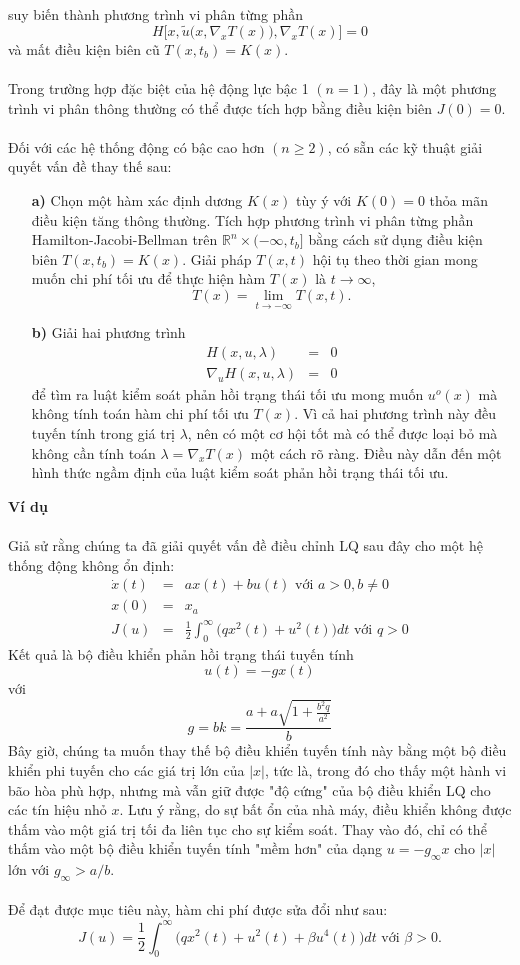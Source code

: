 \documentclass[12pt,a4paper]{report}
\begin{document}
suy biến thành phương trình vi phân từng phần $$H\big[x, \tilde{u}\big(x, \nabla_xT(x)\big), \nabla_xT(x)\big] = 0$$ và mất điều kiện biên cũ $T(x, t_b) = K(x)$.\\\\ Trong trường hợp đặc biệt của hệ động lực bậc 1 $(n = 1)$, đây là một phương trình vi phân thông thường có thể được tích hợp bằng điều kiện biên $J(0) = 0$.
\\\\ Đối với các hệ thống động có bậc cao hơn $(n \geq 2)$, có sẵn các kỹ thuật giải quyết vấn đề thay thế sau:
\begin{itemize}
	\item[\textbf{a)}] Chọn một hàm xác định dương $K(x)$ tùy ý với $K (0) = 0$ thỏa mãn điều kiện tăng thông thường. Tích hợp phương trình vi phân từng phần Hamilton-Jacobi-Bellman trên  $\mathbb{R}^n \times (-\infty, t_b]$ bằng cách sử dụng điều kiện biên $T(x, t_b) = K (x)$. Giải pháp $T(x, t)$ hội tụ theo thời gian mong muốn chi phí tối ưu để thực hiện hàm $T(x)$ là $t \to \infty$, $$T(x) = \lim_{t\to -\infty}T(x, t).$$
	\item[\textbf{b)}] Giải hai phương trình
	\begin{eqnarray}
		H(x, u, \lambda) &=& 0 \nonumber \\ \nabla_uH(x, u, \lambda) &=& 0 \nonumber
	\end{eqnarray} để tìm ra luật kiểm soát phản hồi trạng thái tối ưu mong muốn $u^o(x)$ mà không tính toán hàm chi phí tối ưu $T (x)$. Vì cả hai phương trình này đều tuyến tính trong giá trị $\lambda$, nên có một cơ hội tốt mà có thể được loại bỏ mà không cần tính toán $\lambda = \nabla_xT(x)$ một cách rõ ràng. Điều này dẫn đến một hình thức ngầm định của luật kiểm soát phản hồi trạng thái tối ưu.
\end{itemize}
\textbf{Ví dụ}\\\\ Giả sử rằng chúng ta đã giải quyết vấn đề điều chỉnh LQ sau đây cho một hệ thống động không ổn định: \begin{eqnarray}
	\dot{x}(t) &=& ax(t)+bu(t) \text{ với } a > 0, b \neq 0 \nonumber \\ x(0) &=& x_a \nonumber\\ J(u) &=& \frac{1}{2}\int_{0}^{\infty}\big(qx^2(t) + u^2(t)\big)dt \text{ với } q > 0 \nonumber
\end{eqnarray}
Kết quả là bộ điều khiển phản hồi trạng thái tuyến tính $$u(t) = -gx(t)$$ với $$g = bk = \frac{a + a\sqrt{1+\frac{b^2q}{a^2}}}{b}$$ Bây giờ, chúng ta muốn thay thế bộ điều khiển tuyến tính này bằng một bộ điều khiển phi tuyến cho các giá trị lớn của $|x|$, tức là, trong đó cho thấy một hành vi bão hòa phù hợp, nhưng mà vẫn giữ được "độ cứng" của bộ điều khiển LQ cho các tín hiệu nhỏ $x$. Lưu ý rằng, do sự bất ổn của nhà máy, điều khiển không được thấm vào một giá trị tối đa liên tục cho sự kiểm soát. Thay vào đó, chỉ có thể thấm vào một bộ điều khiển tuyến tính "mềm hơn" của dạng $u = - g_{\infty} x$ cho  $|x|$ lớn với $g _{\infty} > a/b$. \\\\ Để đạt được mục tiêu này, hàm chi phí được sửa đổi như sau: $$J(u) = \frac{1}{2}\int_{0}^{\infty} \big(qx^2(t) + u^2(t) + \beta u^4(t)\big)dt \text{ với } \beta > 0.$$
\end{document}
